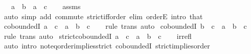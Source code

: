 \begin{isabellebody}
\ \ \ {\isachardoublequoteopen}a\ \isactrlbold {\isacharless}{\kern0pt}\ b{\isachardoublequoteclose}\ \ {\isachardoublequoteopen}a\ \isactrlbold {\isacharless}{\kern0pt}\ c{\isachardoublequoteclose}\isanewline
%
\isadelimproof
\ \ %
\endisadelimproof
%
\isatagproof
{}\isamarkupfalse%
\ assms\ \isamarkupfalse%
\ {\isacharparenleft}{\kern0pt}auto\ simp\ add{\isacharcolon}{\kern0pt}\ commute\ strict{\isacharunderscore}{\kern0pt}iff{\isacharunderscore}{\kern0pt}order\ elim{\isacharcolon}{\kern0pt}\ orderE\ intro{\isacharbang}{\kern0pt}{\isacharcolon}{\kern0pt}\ that{\isacharparenright}{\kern0pt}{\isacharplus}{\kern0pt}%
\endisatagproof
{\isafoldproof}%
%
\isadelimproof
\isanewline
%
\endisadelimproof
\isanewline
{}\isamarkupfalse%
\ coboundedI{}{\isacharcolon}{\kern0pt}\ {\isachardoublequoteopen}a\ \isactrlbold {\isasymle}\ c\ {\isasymLongrightarrow}\ a\ \isactrlbold {\isacharasterisk}{\kern0pt}\ b\ \isactrlbold {\isasymle}\ c{\isachardoublequoteclose}\isanewline
%
\isadelimproof
\ \ %
\endisadelimproof
%
\isatagproof
{}\isamarkupfalse%
\ {\isacharparenleft}{\kern0pt}rule\ trans{\isacharparenright}{\kern0pt}\ auto%
\endisatagproof
{\isafoldproof}%
%
\isadelimproof
\isanewline
%
\endisadelimproof
\isanewline
{}\isamarkupfalse%
\ coboundedI{}{\isacharcolon}{\kern0pt}\ {\isachardoublequoteopen}b\ \isactrlbold {\isasymle}\ c\ {\isasymLongrightarrow}\ a\ \isactrlbold {\isacharasterisk}{\kern0pt}\ b\ \isactrlbold {\isasymle}\ c{\isachardoublequoteclose}\isanewline
%
\isadelimproof
\ \ %
\endisadelimproof
%
\isatagproof
{}\isamarkupfalse%
\ {\isacharparenleft}{\kern0pt}rule\ trans{\isacharparenright}{\kern0pt}\ auto%
\endisatagproof
{\isafoldproof}%
%
\isadelimproof
\isanewline
%
\endisadelimproof
\isanewline
{}\isamarkupfalse%
\ strict{\isacharunderscore}{\kern0pt}coboundedI{}{\isacharcolon}{\kern0pt}\ {\isachardoublequoteopen}a\ \isactrlbold {\isacharless}{\kern0pt}\ c\ {\isasymLongrightarrow}\ a\ \isactrlbold {\isacharasterisk}{\kern0pt}\ b\ \isactrlbold {\isacharless}{\kern0pt}\ c{\isachardoublequoteclose}\isanewline
%
\isadelimproof
\ \ %
\endisadelimproof
%
\isatagproof
{}\isamarkupfalse%
\ irrefl\isanewline
\ \ \isamarkupfalse%
\ {\isacharparenleft}{\kern0pt}auto\ intro{\isacharcolon}{\kern0pt}\ not{\isacharunderscore}{\kern0pt}eq{\isacharunderscore}{\kern0pt}order{\isacharunderscore}{\kern0pt}implies{\isacharunderscore}{\kern0pt}strict\ coboundedI{}\ strict{\isacharunderscore}{\kern0pt}implies{\isacharunderscore}{\kern0pt}order\isanewline

\end{isabellebody}
